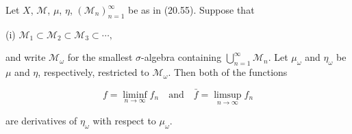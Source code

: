 Let $X$, $\mathcal{M}$, $\mu$, $\eta$, $(\mathcal{M}_n)_{n=1}^{\infty}$ be as in (20.55). Suppose that

(i) $\mathcal{M}_1 \subset \mathcal{M}_2 \subset \mathcal{M}_3 \subset \cdots,$

and write $\mathcal{M}_\omega$ for the smallest $\sigma$-algebra containing $\bigcup_{n=1}^{\infty} \mathcal{M}_n$. Let $\mu_\omega$ and $\eta_\omega$ be $\mu$ and $\eta$, respectively, restricted to $\mathcal{M}_\omega$. Then both of the functions

$$f = \liminf_{n \to \infty} f_n \quad \text{and} \quad \bar{f} = \limsup_{n \to \infty} f_n$$

are derivatives of $\eta_\omega$ with respect to $\mu_\omega$.
